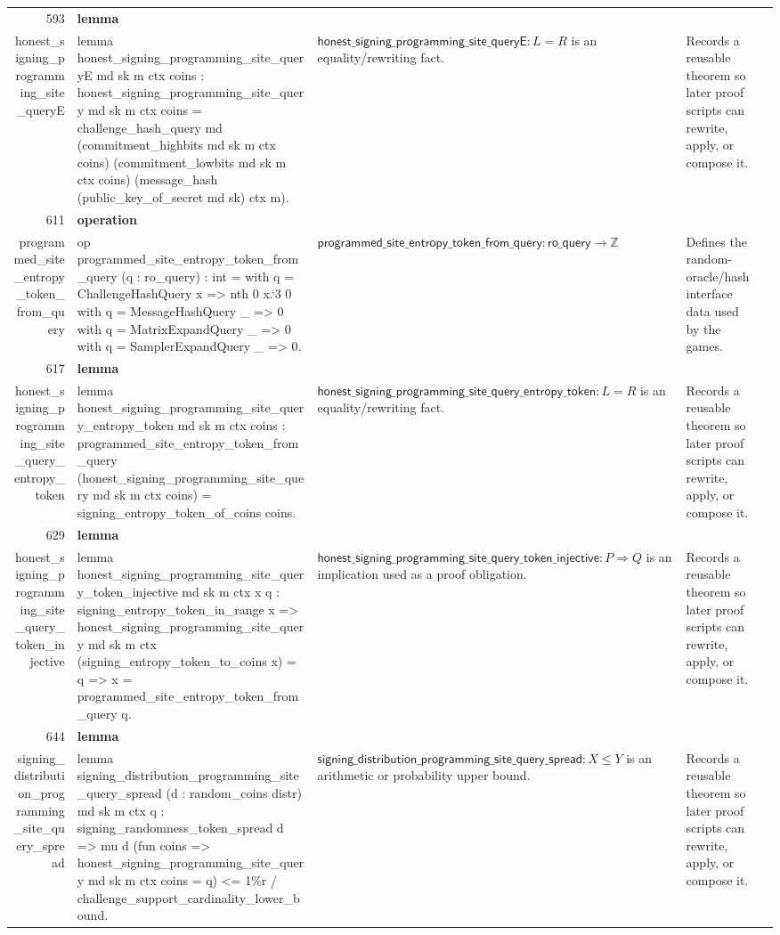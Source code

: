 \documentclass[10pt]{article}
\newcommand{\ec}[1]{\begingroup\ttfamily\scriptsize #1\endgroup}
\begin{document}
\begin{longtable}{r L{0.17\textwidth} L{0.26\textwidth} L{0.27\textwidth} L{0.20\textwidth}}
593 & \textbf{lemma}\\\ec{honest\_signing\_programming\_site\_queryE} & \ec{lemma honest\_signing\_programming\_site\_queryE md sk m ctx coins : honest\_signing\_programming\_site\_query md sk m ctx coins = challenge\_hash\_query md (commitment\_highbits md sk m ctx coins) (commitment\_lowbits md sk m ctx coins) (message\_hash (public\_key\_of\_secret md sk) ctx m).} & \(\mathsf{honest\_signing\_programming\_site\_queryE} : L = R\) is an equality/rewriting fact. & Records a reusable theorem so later proof scripts can rewrite, apply, or compose it. \\
611 & \textbf{operation}\\\ec{programmed\_site\_entropy\_token\_from\_query} & \ec{op programmed\_site\_entropy\_token\_from\_query (q : ro\_query) : int = with q = ChallengeHashQuery x => nth 0 x.`3 0 with q = MessageHashQuery \_ => 0 with q = MatrixExpandQuery \_ => 0 with q = SamplerExpandQuery \_ => 0.} & \(\mathsf{programmed\_site\_entropy\_token\_from\_query} : \mathsf{ro\_query} \to \mathbb{Z}\) & Defines the random-oracle/hash interface data used by the games. \\
617 & \textbf{lemma}\\\ec{honest\_signing\_programming\_site\_query\_entropy\_token} & \ec{lemma honest\_signing\_programming\_site\_query\_entropy\_token md sk m ctx coins : programmed\_site\_entropy\_token\_from\_query (honest\_signing\_programming\_site\_query md sk m ctx coins) = signing\_entropy\_token\_of\_coins coins.} & \(\mathsf{honest\_signing\_programming\_site\_query\_entropy\_token} : L = R\) is an equality/rewriting fact. & Records a reusable theorem so later proof scripts can rewrite, apply, or compose it. \\
629 & \textbf{lemma}\\\ec{honest\_signing\_programming\_site\_query\_token\_injective} & \ec{lemma honest\_signing\_programming\_site\_query\_token\_injective md sk m ctx x q : signing\_entropy\_token\_in\_range x => honest\_signing\_programming\_site\_query md sk m ctx (signing\_entropy\_token\_to\_coins x) = q => x = programmed\_site\_entropy\_token\_from\_query q.} & \(\mathsf{honest\_signing\_programming\_site\_query\_token\_injective} : P \Rightarrow Q\) is an implication used as a proof obligation. & Records a reusable theorem so later proof scripts can rewrite, apply, or compose it. \\
644 & \textbf{lemma}\\\ec{signing\_distribution\_programming\_site\_query\_spread} & \ec{lemma signing\_distribution\_programming\_site\_query\_spread (d : random\_coins distr) md sk m ctx q : signing\_randomness\_token\_spread d => mu d (fun coins => honest\_signing\_programming\_site\_query md sk m ctx coins = q) <= 1\%r / challenge\_support\_cardinality\_lower\_bound.} & \(\mathsf{signing\_distribution\_programming\_site\_query\_spread} : X \le Y\) is an arithmetic or probability upper bound. & Records a reusable theorem so later proof scripts can rewrite, apply, or compose it. \\

\end{longtable}
\end{document}
